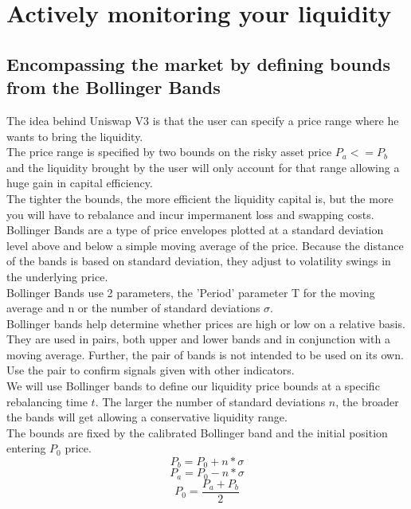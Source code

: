 \documentclass[conference]{IEEEtran}
\begin{document}
\section{Actively monitoring your liquidity}
\subsection{Encompassing the market by defining bounds from the Bollinger Bands}
The idea behind Uniswap V3 is that the user can specify a price range where he wants to bring the liquidity.
\\
The price range is specified by two bounds on the risky asset price $P_a <= P_b$ and the liquidity brought by the user will only account for that range allowing a huge gain in capital efficiency.\\
The tighter the bounds, the more efficient the liquidity capital is, but the more you will have to rebalance and incur impermanent loss and swapping costs.\\
Bollinger Bands are a type of price envelopes plotted at a standard deviation level above and below a simple moving average of the price. Because the distance of the bands is based on standard deviation, they adjust to volatility swings in the underlying price.\\
Bollinger Bands use 2 parameters, the 'Period' parameter T for the moving average and n or the number of standard deviations $\sigma$. \\
Bollinger bands help determine whether prices are high or low on a relative basis. They are used in pairs, both upper and lower bands and in conjunction with a moving average. Further, the pair of bands is not intended to be used on its own. Use the pair to confirm signals given with other indicators.\\
We will use Bollinger bands to define our liquidity price bounds at a specific rebalancing time $t$. The larger the number of standard deviations $n$, the broader the bands will get allowing a conservative liquidity range.\\
The bounds are fixed by the calibrated Bollinger band and the initial position entering $P_0$ price.
\begin{equation}
P_b = P_0 + n*\sigma
\end{equation}
\begin{equation}
P_a = P_0 - n*\sigma
\end{equation}
\begin{equation}
P_0 = \frac{P_a + P_b}{2} 
\end{equation}
\end{document}
